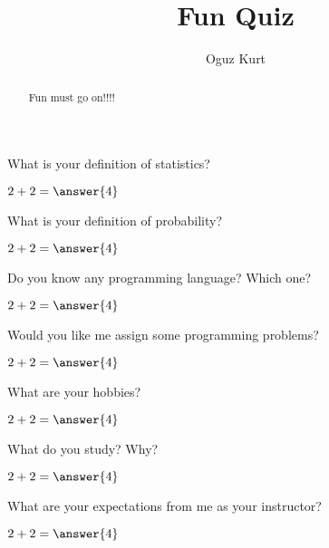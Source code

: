 \documentclass{ximera}
\title{Fun Quiz}
\author{Oguz Kurt}
\begin{document}
\begin{abstract}
Fun must go on!!!!
\end{abstract}
\maketitle

\begin{problem}
What is your definition of statistics?

\begin{freeResponse}
\end{freeResponse}
$2+2=\answer{4}$

\end{problem}

\begin{problem}
What is your definition of probability?

\begin{freeResponse}
\end{freeResponse}

$2+2=\answer{4}$
\end{problem}

\begin{problem}
Do you know any programming language? Which one?
\begin{freeResponse}
\end{freeResponse}

$2+2=\answer{4}$
\end{problem}


\begin{problem}
Would you like me assign some programming problems?
\begin{freeResponse}
\end{freeResponse}

$2+2=\answer{4}$
\end{problem}

\begin{problem}
What are your hobbies?

\begin{freeResponse}
\end{freeResponse}

$2+2=\answer{4}$
\end{problem}

\begin{problem}
What do you study? Why?
\begin{freeResponse}
\end{freeResponse}

$2+2=\answer{4}$
\end{problem}

\begin{problem}
What are your expectations from me as your instructor?

\begin{freeResponse}
\end{freeResponse}

$2+2=\answer{4}$
\end{problem}
\end{document}
